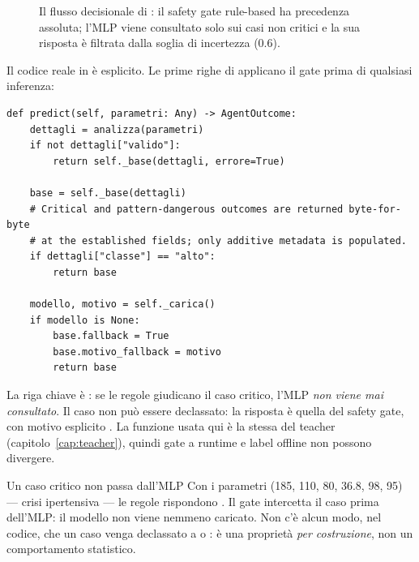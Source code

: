 \begin{figure}[htbp]
  \centering
  
  \caption{Il flusso decisionale di : il
  safety gate rule-based ha precedenza assoluta; l'MLP viene consultato solo
  sui casi non critici e la sua risposta è filtrata dalla soglia di
  incertezza (0.6).}
  \label{fig:diagramma-flusso-gate}
\end{figure}

Il codice reale in 
è esplicito. Le prime righe di  applicano il gate prima di
qualsiasi inferenza:

\begin{lstlisting}[caption={Il safety gate con precedenza assoluta in \codice{SupervisedAgent.predict} (\file{supervised\_agent.py}).}]
def predict(self, parametri: Any) -> AgentOutcome:
    dettagli = analizza(parametri)
    if not dettagli["valido"]:
        return self._base(dettagli, errore=True)

    base = self._base(dettagli)
    # Critical and pattern-dangerous outcomes are returned byte-for-byte
    # at the established fields; only additive metadata is populated.
    if dettagli["classe"] == "alto":
        return base

    modello, motivo = self._carica()
    if modello is None:
        base.fallback = True
        base.motivo_fallback = motivo
        return base
\end{lstlisting}

La riga chiave è :
se le regole giudicano il caso critico, l'MLP \emph{non viene mai
consultato}. Il caso non può essere declassato: la risposta è quella del
safety gate, con motivo esplicito . La funzione  usata qui è la stessa del
teacher (capitolo~\ref{cap:teacher}), quindi gate a runtime e label offline
non possono divergere.

\begin{esempio}{Un caso critico non passa dall'MLP}
Con i parametri (185, 110, 80, 36.8, 98, 95) — crisi ipertensiva — le
regole rispondono . Il gate intercetta il caso prima dell'MLP:
il modello non viene nemmeno caricato. Non c'è alcun modo, nel codice, che
un caso  venga declassato a  o :
è una proprietà \emph{per costruzione}, non un comportamento statistico.
\end{esempio}

